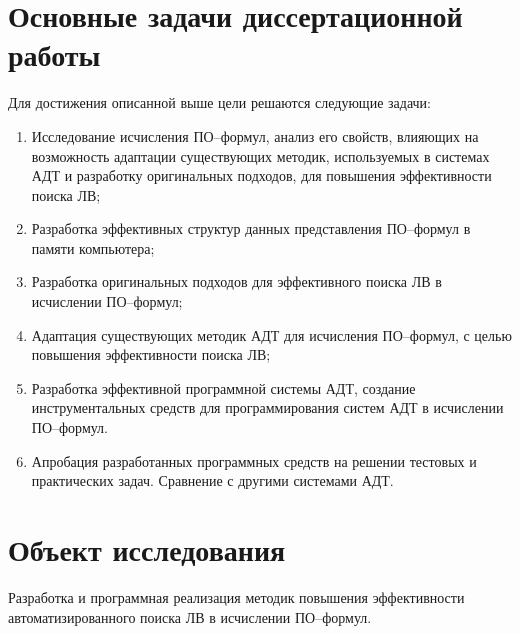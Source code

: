 \section*{Основные задачи диссертационной работы}
Для достижения описанной выше цели решаются следующие задачи:
\begin{enumerate}
\item Исследование исчисления ПО--формул, анализ его свойств, влияющих на возможность адаптации существующих методик, используемых в системах АДТ и разработку оригинальных подходов, для повышения эффективности поиска ЛВ;
\item Разработка эффективных структур данных представления ПО--формул в памяти компьютера;
\item Разработка оригинальных подходов для эффективного поиска ЛВ в исчислении ПО--формул; 
\item Адаптация существующих методик АДТ для исчисления ПО--формул, с целью повышения эффективности поиска ЛВ;
\item Разработка эффективной программной системы АДТ, создание инструментальных средств для программирования систем АДТ в исчислении ПО--формул.
\item Апробация разработанных программных средств на решении тестовых и практических задач. Сравнение с другими системами АДТ.
\end{enumerate}


\section*{Объект исследования}
Разработка и программная реализация методик повышения эффективности автоматизированного поиска ЛВ в исчислении ПО--формул.


